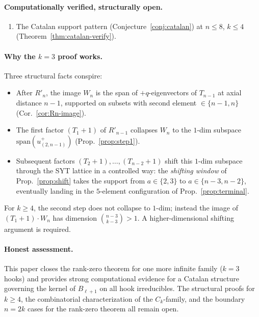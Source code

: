\documentclass[11pt]{article}
\theoremstyle{definition}
\begin{document}
\paragraph{Computationally verified, structurally open.}
\begin{enumerate}[leftmargin=2em,topsep=0.3em,itemsep=0.2em]
\item The Catalan support pattern (Conjecture~\ref{conj:catalan}) at
$n\le 8$, $k\le 4$ (Theorem~\ref{thm:catalan-verify}).
\end{enumerate}

\paragraph{Why the $k=3$ proof works.}  Three structural facts conspire:
\begin{itemize}[leftmargin=2em,topsep=0.3em,itemsep=0.2em]
\item After $R'_n$, the image $W_n$ is the span of $+q$-eigenvectors of
$T_{n-1}$ at axial distance $n-1$, supported on subsets with second
element $\in\{n-1,n\}$ (Cor.~\ref{cor:Rn-image}).
\item The first factor $(T_1{+}1)$ of $R'_{n-1}$ collapses $W_n$ to the
$1$-dim subspace $\mathrm{span}(u^+_{(2,n-1)})$
(Prop.~\ref{prop:step1}).
\item Subsequent factors $(T_2{+}1),\ldots,(T_{n-2}{+}1)$ shift this
$1$-dim subspace through the SYT lattice in a controlled way: the
\emph{shifting window} of Prop.~\ref{prop:shift} takes the support
from $a\in\{2,3\}$ to $a\in\{n-3,n-2\}$, eventually landing in the
$5$-element configuration of Prop.~\ref{prop:terminal}.
\end{itemize}
For $k\ge 4$, the second step does not collapse to $1$-dim; instead the
image of $(T_1{+}1)\cdot W_n$ has dimension
$\binom{n-3}{k-3}>1$.  A higher-dimensional shifting argument is
required.

\paragraph{Honest assessment.}  This paper closes the rank-zero theorem
for one more infinite family ($k=3$ hooks) and provides strong
computational evidence for a Catalan structure governing the kernel of
$B_{\ell+1}$ on all hook irreducibles.  The structural proofs for
$k\ge 4$, the combinatorial characterization of the $C_k$-family, and
the boundary $n=2k$ cases for the rank-zero theorem all remain open.
\end{document}
